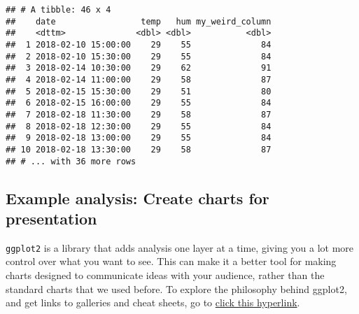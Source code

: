 \documentclass[
]{article}
\newenvironment{Shaded}{\begin{snugshade}}{\end{snugshade}}
\newcommand{\CommentTok}[1]{\textcolor[rgb]{0.56,0.35,0.01}{\textit{#1}}}
\newcommand{\DataTypeTok}[1]{\textcolor[rgb]{0.13,0.29,0.53}{#1}}
\newcommand{\FloatTok}[1]{\textcolor[rgb]{0.00,0.00,0.81}{#1}}
\newcommand{\KeywordTok}[1]{\textcolor[rgb]{0.13,0.29,0.53}{\textbf{#1}}}
\newcommand{\NormalTok}[1]{#1}
\newcommand{\OperatorTok}[1]{\textcolor[rgb]{0.81,0.36,0.00}{\textbf{#1}}}
\newcommand{\StringTok}[1]{\textcolor[rgb]{0.31,0.60,0.02}{#1}}
\begin{document}
\begin{verbatim}
## # A tibble: 46 x 4
##    date                 temp   hum my_weird_column
##    <dttm>              <dbl> <dbl>           <dbl>
##  1 2018-02-10 15:00:00    29    55              84
##  2 2018-02-10 15:30:00    29    55              84
##  3 2018-02-14 10:30:00    29    62              91
##  4 2018-02-14 11:00:00    29    58              87
##  5 2018-02-15 15:30:00    29    51              80
##  6 2018-02-15 16:00:00    29    55              84
##  7 2018-02-18 11:30:00    29    58              87
##  8 2018-02-18 12:30:00    29    55              84
##  9 2018-02-18 13:00:00    29    55              84
## 10 2018-02-18 13:30:00    29    58              87
## # ... with 36 more rows
\end{verbatim}

\hypertarget{example-analysis-create-charts-for-presentation}{%
\subsection{Example analysis: Create charts for
presentation}\label{example-analysis-create-charts-for-presentation}}

\texttt{ggplot2} is a library that adds analysis one layer at a time,
giving you a lot more control over what you want to see. This can make
it a better tool for making charts designed to communicate ideas with
your audience, rather than the standard charts that we used before. To
explore the philosophy behind ggplot2, and get links to galleries and
cheat sheets, go to \href{https://ggplot2.tidyverse.org/}{click this
hyperlink}.

\begin{Shaded}
\end{Shaded}
\end{document}
